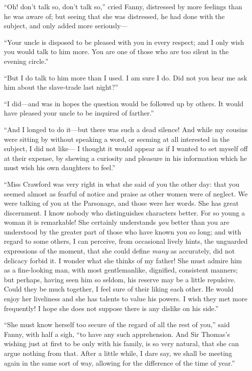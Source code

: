 ``Oh! don't talk so, don't talk so,'' cried Fanny,
distressed by more feelings than he was aware of; but seeing
that she was distressed, he had done with the subject,
and only added more seriously---%

``Your uncle is disposed to be pleased with you in
every respect; and I only wish you would talk to him more.
You are one of those who are too silent in the evening circle.''

``But I do talk to him more than I used.  I am sure I do.
Did not you hear me ask him about the slave-trade
last night?''

``I did---and was in hopes the question would be followed
up by others.  It would have pleased your uncle to be
inquired of farther.''

``And I longed to do it---but there was such a dead silence!
And while my cousins were sitting by without speaking a word,
or seeming at all interested in the subject, I did not like---%
I thought it would appear as if I wanted to set myself
off at their expense, by shewing a curiosity and pleasure
in his information which he must wish his own daughters
to feel.''

``Miss Crawford was very right in what she said of you
the other day:  that you seemed almost as fearful of notice
and praise as other women were of neglect.  We were talking
of you at the Parsonage, and those were her words.
She has great discernment.  I know nobody who distinguishes
characters better.  For so young a woman it is remarkable!
She certainly understands \emph{you} better than you are
understood by the greater part of those who have known you
so long; and with regard to some others, I can perceive,
from occasional lively hints, the unguarded expressions
of the moment, that she could define \emph{many} as accurately,
did not delicacy forbid it.  I wonder what she thinks
of my father!  She must admire him as a fine-looking man,
with most gentlemanlike, dignified, consistent manners;
but perhaps, having seen him so seldom, his reserve
may be a little repulsive.  Could they be much together,
I feel sure of their liking each other.  He would enjoy
her liveliness and she has talents to value his powers.
I wish they met more frequently!  I hope she does not suppose
there is any dislike on his side.''

``She must know herself too secure of the regard of all
the rest of you,'' said Fanny, with half a sigh, ``to have
any such apprehension.  And Sir Thomas's wishing just at
first to be only with his family, is so very natural,
that she can argue nothing from that.  After a little while,
I dare say, we shall be meeting again in the same sort
of way, allowing for the difference of the time of year.''

